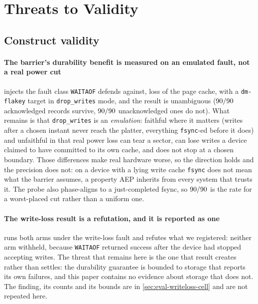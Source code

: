 \section{Threats to Validity}
\label{sec:threats}


\subsection{Construct validity}

\paragraph{The barrier's durability benefit is measured on an emulated fault,
not a real power cut}  injects the fault class
\texttt{WAITAOF} defends against, loss of the page cache, with a
\texttt{dm-flakey} target in \texttt{drop\_writes} mode, and the result is
unambiguous ($90/90{}$ acknowledged records survive,
$90/90{}$ unacknowledged ones do not). What remains is that
\texttt{drop\_writes} is an \emph{emulation}: faithful where it matters
(writes after a chosen instant never reach the platter, everything
\texttt{fsync}-ed before it does) and unfaithful in that real power loss can
tear a sector, can lose writes a device claimed to have committed to its own
cache, and does not stop at a chosen boundary. Those differences make real
hardware worse, so the direction holds and the precision does not: on a device
with a lying write cache \texttt{fsync} does not mean what the barrier assumes,
a property AEP inherits from every system that trusts it. The probe also
phase-aligns to a just-completed fsync, so $90/90{}$ is the rate for
a worst-placed cut rather than a uniform one.

\paragraph{The write-loss result is a refutation, and it is reported as one}
 runs both arms under the write-loss fault and
refutes what we registered: neither arm withheld, because \texttt{WAITAOF}
returned success after the device had stopped accepting writes. The threat that
remains here is the one that result creates rather than settles: the
durability guarantee is bounded to storage that reports its own failures, and
this paper contains no evidence about storage that does not. The finding, its
counts and its bounds are in \cref{sec:eval-writeloss-cell} and are not repeated
here.

